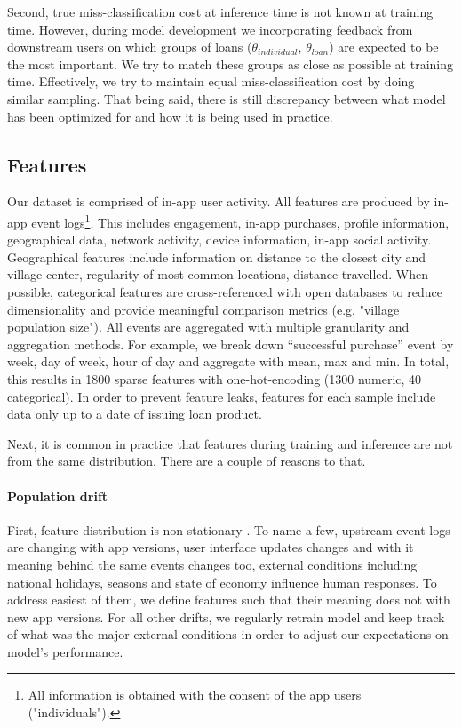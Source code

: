\documentclass{article}
\begin{document}
Second, true miss-classification cost at inference time is not known at training time. However, during model development we incorporating feedback from downstream users on which groups of loans ($\theta_{individual}$, $\theta_{loan}$) are expected to be the most important. We try to match these groups as close as possible at training time. Effectively, we try to maintain equal miss-classification cost by doing similar sampling. That being said, there is still discrepancy between what model has been optimized for and how it is being used in practice.

\subsection{Features}
Our dataset is comprised of in-app user activity. All features are produced by in-app event logs\footnote{All information is obtained with the consent of the app users ("individuals").}. This includes engagement, in-app purchases, profile information, geographical data, network activity, device information, in-app social activity. Geographical features include information on distance to the closest city and village center, regularity of most common locations, distance travelled. When possible, categorical features are cross-referenced with open databases to reduce dimensionality and provide meaningful comparison metrics (e.g. "village population size"). All events are aggregated with multiple granularity and aggregation methods. For example, we break down “successful purchase” event by week, day of week, hour of day and aggregate with mean, max and min. In total, this results in 1800 sparse features with one-hot-encoding (1300 numeric, 40 categorical). In order to prevent feature leaks, features for each sample include data only up to a date of issuing loan product.

Next, it is common in practice that features during training and inference are not from the same distribution. There are a couple of reasons to that.

\paragraph{Population drift}
First, feature distribution is non-stationary \cite{practical, practical-comment}. To name a few, upstream event logs are changing with app versions, user interface updates changes and with it meaning behind the same events changes too, external conditions including national holidays, seasons and state of economy influence human responses. To address easiest of them, we define features such that their meaning does not with new app versions. For all other drifts, we regularly retrain model and keep track of what was the major external conditions in order to adjust our expectations on model's performance.
\end{document}
